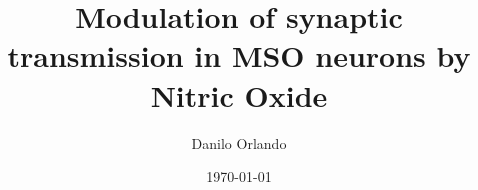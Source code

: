 \documentclass[12pt,oneside,abbrevs,dtc,mscres,neuro,notimes,logo]{styles/infthesis}
\title{Modulation of synaptic transmission in MSO neurons by Nitric Oxide}
\author{Danilo Orlando}
\date{\today}
\begin{document}
  \begin{preliminary}
    \maketitle

    
    \standarddeclaration
    
    \tableofcontents
    \listoffigures
  \end{preliminary}

  
  
  
  



  {}
  
\end{document}
